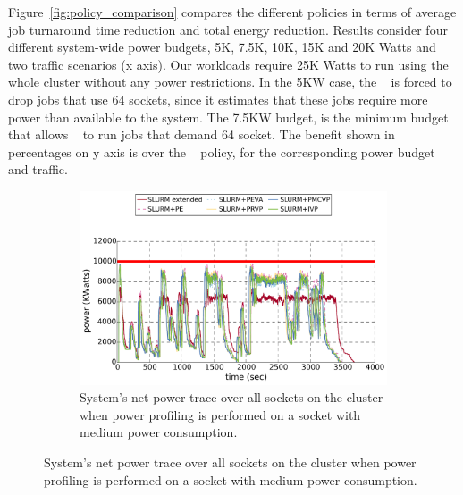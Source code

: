 Figure~\ref{fig:policy_comparison} compares the different policies in terms of average job turnaround time reduction and total energy reduction. 
Results consider four different system-wide power budgets, 5K, 7.5K, 10K, 15K and 20K Watts and two traffic scenarios (x axis).  
Our workloads require 25K Watts to run using the whole cluster without any power restrictions.  In the 5KW case, the \DefaultSched~ is forced to drop jobs
that use 64 sockets, since it estimates that these jobs require more power than available to the system.  The 7.5KW budget, is the minimum budget that allows 
\DefaultSched~ to run jobs that demand 64 socket.  
The benefit shown in percentages on y axis is over the \DefaultSched~ policy, for the corresponding power budget and traffic.

\begin{figure}[p]
        \centering
  \begin{subfigure}[b]{.9\textwidth}
    \includegraphics[width=\textwidth]{power_aware_job_scheduling/figures/net_power_trace_default}
    \caption{System's net power trace over all sockets on the cluster when power profiling is performed on a socket with medium power consumption.}
    \label{fig:net_power_trace}
  \end{subfigure}%


\end{figure}
